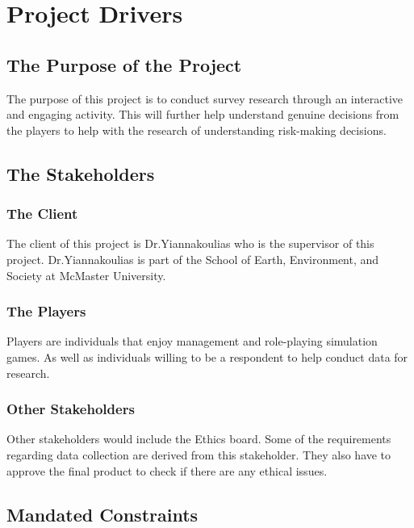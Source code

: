 \documentclass{article}
\begin{document}
\section{Project Drivers}

\subsection{The Purpose of the Project}
The purpose of this project is to conduct survey research through an interactive and engaging activity. This will further help understand genuine decisions from the players to help with the research of understanding risk-making decisions.


\subsection{The Stakeholders}

\subsubsection{The Client}
The client of this project is Dr.Yiannakoulias who is the supervisor of this project. Dr.Yiannakoulias is part of the School of Earth, Environment, and Society at McMaster University.

\subsubsection{The Players}
Players are individuals that enjoy management and role-playing simulation games. As well as individuals willing to be a respondent to help conduct data for research.

\subsubsection{Other Stakeholders}
Other stakeholders would include the Ethics board. Some of the requirements regarding data collection are derived from this stakeholder. They also have to approve the final product to check if there are any ethical issues.

\subsection{Mandated Constraints}
\end{document}
